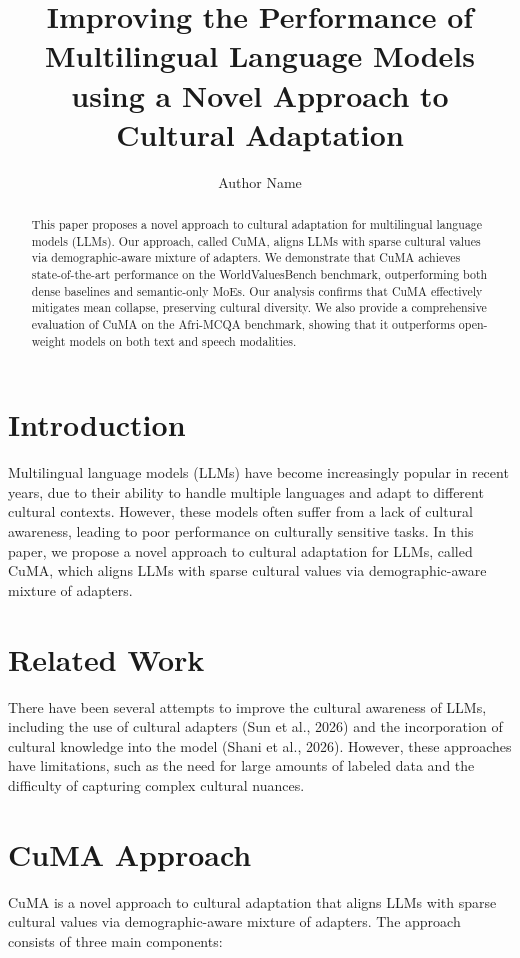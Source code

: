 \documentclass{article}
\begin{document}
\title{Improving the Performance of Multilingual Language Models using a Novel Approach to Cultural Adaptation}

\author{Author Name}

\maketitle

\begin{abstract}
This paper proposes a novel approach to cultural adaptation for multilingual language models (LLMs). Our approach, called CuMA, aligns LLMs with sparse cultural values via demographic-aware mixture of adapters. We demonstrate that CuMA achieves state-of-the-art performance on the WorldValuesBench benchmark, outperforming both dense baselines and semantic-only MoEs. Our analysis confirms that CuMA effectively mitigates mean collapse, preserving cultural diversity. We also provide a comprehensive evaluation of CuMA on the Afri-MCQA benchmark, showing that it outperforms open-weight models on both text and speech modalities.
\end{abstract}

\section{Introduction}
Multilingual language models (LLMs) have become increasingly popular in recent years, due to their ability to handle multiple languages and adapt to different cultural contexts. However, these models often suffer from a lack of cultural awareness, leading to poor performance on culturally sensitive tasks. In this paper, we propose a novel approach to cultural adaptation for LLMs, called CuMA, which aligns LLMs with sparse cultural values via demographic-aware mixture of adapters.

\section{Related Work}
There have been several attempts to improve the cultural awareness of LLMs, including the use of cultural adapters (Sun et al., 2026) and the incorporation of cultural knowledge into the model (Shani et al., 2026). However, these approaches have limitations, such as the need for large amounts of labeled data and the difficulty of capturing complex cultural nuances.

\section{CuMA Approach}
CuMA is a novel approach to cultural adaptation that aligns LLMs with sparse cultural values via demographic-aware mixture of adapters. The approach consists of three main components:
\end{document}
